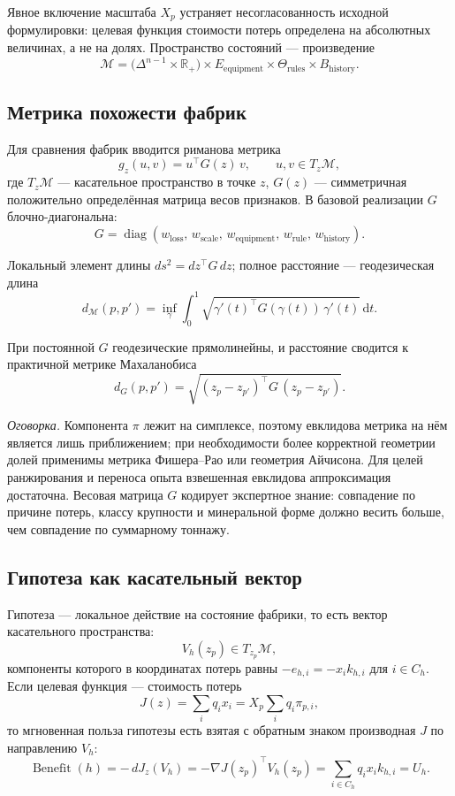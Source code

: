 \documentclass[12pt,a4paper]{article}
\newcommand{\R}{\mathbb{R}}
\newcommand{\Manifold}{\mathcal{M}}
\newcommand{\dd}{\,\mathrm{d}}
\DeclareMathOperator{\diag}{diag}
\begin{document}
Явное включение масштаба \(X_p\) устраняет несогласованность исходной
формулировки: целевая функция стоимости потерь определена на абсолютных
величинах, а не на долях. Пространство состояний --- произведение
\[
  \Manifold =
  \bigl(\Delta^{n-1} \times \R_+\bigr)
  \times
  E_{\text{equipment}}
  \times
  \Theta_{\text{rules}}
  \times
  B_{\text{history}}.
\]

\subsection{Метрика похожести фабрик}

Для сравнения фабрик вводится риманова метрика
\[
  g_z(u,v) = u^\top G(z)\,v,
  \qquad u,v \in T_z\Manifold,
\]
где \(T_z\Manifold\) --- касательное пространство в точке \(z\),
\(G(z)\) --- симметричная положительно определённая матрица весов признаков.
В базовой реализации \(G\) блочно-диагональна:
\[
  G =
  \diag
  (w_{\text{loss}},\, w_{\text{scale}},\, w_{\text{equipment}},\,
   w_{\text{rule}},\, w_{\text{history}}).
\]

Локальный элемент длины \(ds^2 = dz^\top G\, dz\); полное расстояние ---
геодезическая длина
\[
  d_\Manifold(p,p')
  =
  \inf_{\gamma}
  \int_0^1
  \sqrt{\gamma'(t)^\top G(\gamma(t))\,\gamma'(t)}
  \dd t.
\]

При постоянной \(G\) геодезические прямолинейны, и расстояние сводится к
практичной метрике Махаланобиса
\[
  d_G(p,p') =
  \sqrt{(z_p-z_{p'})^\top G\,(z_p-z_{p'})}.
\]

\emph{Оговорка.} Компонента \(\pi\) лежит на симплексе, поэтому евклидова
метрика на нём является лишь приближением; при необходимости более корректной
геометрии долей применимы метрика Фишера--Рао или геометрия Айчисона.
Для целей ранжирования и переноса опыта взвешенная евклидова аппроксимация
достаточна. Весовая матрица \(G\) кодирует экспертное знание: совпадение по
причине потерь, классу крупности и минеральной форме должно весить больше, чем
совпадение по суммарному тоннажу.

\subsection{Гипотеза как касательный вектор}

Гипотеза --- локальное действие на состояние фабрики, то есть вектор
касательного пространства:
\[
  V_h(z_p) \in T_{z_p}\Manifold,
\]
компоненты которого в координатах потерь равны \(-e_{h,i} = -x_i k_{h,i}\)
для \(i \in C_h\). Если целевая функция --- стоимость потерь
\[
  J(z) = \sum_i q_i x_i = X_p \sum_i q_i \pi_{p,i},
\]
то мгновенная польза гипотезы есть взятая с обратным знаком производная
\(J\) по направлению \(V_h\):
\[
  \operatorname{Benefit}(h)
  =
  -\,dJ_z(V_h)
  =
  -\nabla J(z_p)^\top V_h(z_p)
  =
  \sum_{i \in C_h} q_i x_i k_{h,i}
  = U_h.
\]
\end{document}
